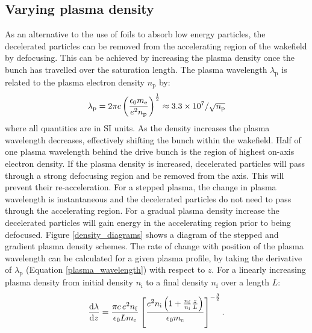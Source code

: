 \documentclass[aip,pop,preprint,superscriptaddress]{revtex4-1}
\begin{document}
\subsection{Varying plasma density}
As an alternative to the use of foils to absorb low energy particles, the decelerated particles can be removed from the accelerating region of the wakefield by defocusing. This can be achieved by increasing the plasma density once the bunch has travelled over the saturation length. The plasma wavelength $\lambda_{\mathrm{p}}$ is related to the plasma electron density $n_{\mathrm{p}}$ by:
\begin{equation}
  \label{plasma_wavelength}
  \lambda_{\mathrm p} = {2 \pi c} \left({\epsilon_0 m_{\mathrm e}}\over{e^2 n_{\mathrm p}}\right)^{1 \over 2} \approx 3.3\times 10^7/ \sqrt{n_{\mathrm{p}}}
\end{equation}
where all quantities are in SI units. As the density increases the plasma wavelength decreases, effectively shifting the bunch within the wakefield. Half of one plasma wavelength behind the drive bunch is the region of highest on-axis electron density. If the plasma density is increased, decelerated particles will pass through a strong defocusing region and be removed from the axis. This will prevent their re-acceleration. For a stepped plasma, the change in plasma wavelength is instantaneous and the decelerated particles do not need to pass through the accelerating region. For a gradual plasma density increase the decelerated particles will gain energy in the accelerating region prior to being defocused. Figure \ref{density_diagrams} shows a diagram of the stepped and gradient plasma density schemes. The rate of change with position of the plasma wavelength can be calculated for a given plasma profile, by taking the derivative of $\lambda_{\mathrm p}$ (Equation \ref{plasma_wavelength}) with respect to $z$. For a linearly increasing plasma density from initial density $n_{\mathrm{i}}$ to a final density $n_{\mathrm{f}}$ over a length $L$:
\begin{equation}
  \label{plasma_wavelength_change}
  {{\mathrm{d}\lambda} \over {\mathrm{d}z}}={{\pi c\,e^2 n_{\mathrm{f}}}\over{\epsilon_0 L m_{\mathrm{e}}}}\left[{e^2 n_{\mathrm{i}}} \left(1+{{{{n_{\mathrm{f}}}}\over{n_{\mathrm{i}}}}{z \over L}}\right)\over{\epsilon_0 m_{\mathrm{e}}}\right]^{-{3 \over 2}}.
\end{equation}
\end{document}
